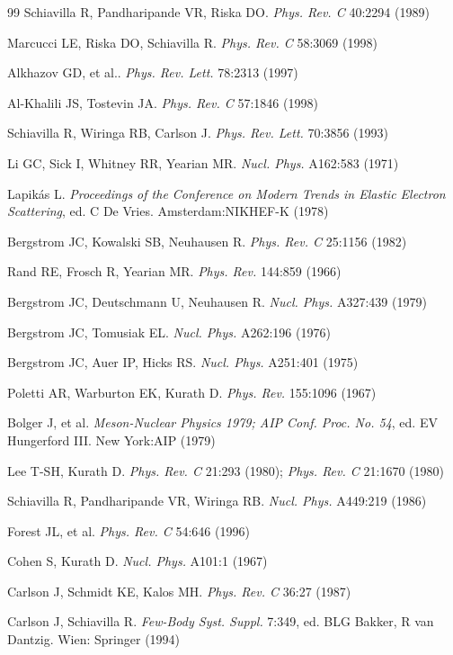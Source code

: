 \begin{thebibliography}{99}
Schiavilla R, Pandharipande VR, Riska DO.
{\it Phys. Rev. C} 40:2294 (1989)

Marcucci LE, Riska DO, Schiavilla R.
{\it Phys. Rev. C} 58:3069 (1998)

Alkhazov GD, et al..
{\it Phys. Rev. Lett.} 78:2313 (1997)

Al-Khalili JS, Tostevin JA.
{\it Phys. Rev. C} 57:1846 (1998)

Schiavilla R, Wiringa RB, Carlson J.
{\it Phys. Rev. Lett.} 70:3856 (1993)

Li GC, Sick I, Whitney RR, Yearian MR.
{\it Nucl. Phys.} A162:583 (1971)

Lapik\'as L.
{\it Proceedings of the Conference on Modern Trends in Elastic
Electron Scattering}, ed. C De Vries.
Amsterdam:NIKHEF-K (1978)

Bergstrom JC, Kowalski SB, Neuhausen R.
{\it Phys. Rev. C} 25:1156 (1982)

Rand RE, Frosch R, Yearian MR.
{\it Phys. Rev.} 144:859 (1966)

Bergstrom JC, Deutschmann U, Neuhausen R.
{\it Nucl. Phys.} A327:439 (1979)

Bergstrom JC, Tomusiak EL.
{\it Nucl. Phys.} A262:196 (1976)

Bergstrom JC, Auer IP, Hicks RS.
{\it Nucl. Phys.} A251:401 (1975)

Poletti AR, Warburton EK, Kurath D.
{\it Phys. Rev.} 155:1096 (1967)

Bolger J, et al.
{\it Meson-Nuclear Physics 1979; AIP Conf. Proc. No. 54}, ed. EV Hungerford III.
New York:AIP (1979)

Lee T-SH, Kurath D.
{\it Phys. Rev. C} 21:293 (1980);
{\it Phys. Rev. C} 21:1670 (1980)

Schiavilla R, Pandharipande VR, Wiringa RB.
{\it Nucl. Phys.} A449:219 (1986)

Forest JL, et al.
{\it Phys. Rev. C} 54:646 (1996)

Cohen S, Kurath D.
{\it Nucl. Phys.} A101:1 (1967)

Carlson J, Schmidt KE, Kalos MH.
{\it Phys. Rev. C} 36:27 (1987)

Carlson J, Schiavilla R.
{\it Few-Body Syst. Suppl.} 7:349, ed. BLG Bakker, R van Dantzig.
Wien: Springer (1994)


\end{thebibliography}
